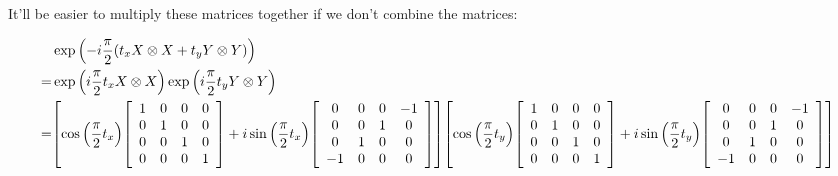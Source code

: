 \documentclass{article}
\begin{document}
It'll be easier to multiply these matrices together if we don't combine the matrices:

\begin{align*}
  &\exp\pqty{-i\frac{\pi}{2}\pqty{t_x X\otimes X + t_y Y\otimes Y}} \\
  =& \exp\pqty{i\frac{\pi}{2}t_x X\otimes X} \exp\pqty{i\frac{\pi}{2}t_y Y\otimes Y} \\
  =&
  \bqty{
  \cos\pqty{\frac{\pi}{2}t_x}
  \bqty{
  \begin{array}{cccc}
    1&0&0&0 \\
    0&1&0&0 \\
    0&0&1&0 \\
    0&0&0&1 \\
  \end{array}
  }
  +
  i\sin\pqty{\frac{\pi}{2}t_x}
  \bqty{
  \begin{array}{cccc}
    0&0&0&-1 \\
    0&0&1&0 \\
    0&1&0&0 \\
    -1&0&0&0 \\
  \end{array}
  }
  }
  \bqty{
  \cos\pqty{\frac{\pi}{2}t_y}
  \bqty{
  \begin{array}{cccc}
    1&0&0&0 \\
    0&1&0&0 \\
    0&0&1&0 \\
    0&0&0&1 \\
  \end{array}
  }
  +
  i\sin\pqty{\frac{\pi}{2}t_y}
  \bqty{
  \begin{array}{cccc}
    0&0&0&-1 \\
    0&0&1&0 \\
    0&1&0&0 \\
    -1&0&0&0 \\
  \end{array}
  }
  }
\end{align*}
\end{document}
